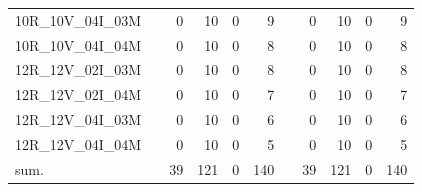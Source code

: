 \begin{tabular}{llrrrrlrrrr}
10R\_10V\_04I\_03M & \hspace{0.1cm} & 0 & 10 & 0 & 9 & \hspace{0.2cm} & 0 & 10 & 0 & 9\\
10R\_10V\_04I\_04M & \hspace{0.1cm} & 0 & 10 & 0 & 8 & \hspace{0.2cm} & 0 & 10 & 0 & 8\\
\addlinespace
12R\_12V\_02I\_03M & \hspace{0.1cm} & 0 & 10 & 0 & 8 & \hspace{0.2cm} & 0 & 10 & 0 & 8\\
12R\_12V\_02I\_04M & \hspace{0.1cm} & 0 & 10 & 0 & 7 & \hspace{0.2cm} & 0 & 10 & 0 & 7\\
12R\_12V\_04I\_03M & \hspace{0.1cm} & 0 & 10 & 0 & 6 & \hspace{0.2cm} & 0 & 10 & 0 & 6\\
12R\_12V\_04I\_04M & \hspace{0.1cm} & 0 & 10 & 0 & 5 & \hspace{0.2cm} & 0 & 10 & 0 & 5\\
\addlinespace
sum. & \hspace{0.1cm} & 39 & 121 & 0 & 140 & \hspace{0.2cm} & 39 & 121 & 0 & 140\\
\bottomrule
\end{tabular}
